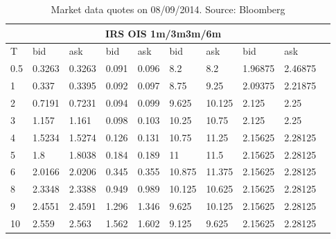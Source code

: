\documentclass[12pt,a4paper]{article}
\theoremstyle{plain}
\numberwithin{equation}{section}
\begin{document}
\begin{table}[t]
\begin{center}
\begin{tabular}{|l|l|l|l|l|l|l|l|l|l|}
\hline
\multicolumn{9}{|c|}{\;\;\;\;\;\;\;\;\;\;\;\;\;\;\;IRS \;\;\;\;\;\;\;\; \;\;\;\;\;\;\;\;\;\;\;\;OIS \;\;\;\;\;\;\;\;\;\;\;\;1m/3m\;\;\;\;\;\;\;\;\;\;\;\;\;3m/6m} \\\hline
T& bid& ask& bid& ask& bid& ask& bid& ask\\ \hline
0.5 & 0.3263 & 0.3263&0.091 & 0.096 & 8.2 & 8.2 & 1.96875 & 2.46875 \\
    1     & 0.337 & 0.3395 & 0.092 & 0.097 & 8.75  & 9.25  & 2.09375& 2.21875 \\
    2     & 0.7191 & 0.7231 & 0.094 & 0.099 & 9.625 & 10.125 & 2.125 & 2.25 \\
    3     & 1.157 & 1.161 & 0.098 & 0.103 & 10.25 & 10.75 & 2.125 & 2.25 \\
    4     & 1.5234 & 1.5274 & 0.126 & 0.131 & 10.75 & 11.25 & 2.15625 & 2.28125 \\
    5     & 1.8   & 1.8038 & 0.184 & 0.189 & 11    & 11.5  & 2.15625 & 2.28125 \\
    6     & 2.0166 & 2.0206 & 0.345 & 0.355 & 10.875 & 11.375 & 2.15625 & 2.28125 \\
    8     & 2.3348 & 2.3388 & 0.949 & 0.989 & 10.125 & 10.625 & 2.15625 & 2.28125 \\
    9     & 2.4551 & 2.4591 & 1.296 & 1.346 & 9.625 & 10.125 & 2.15625 & 2.28125 \\
    10    & 2.559 & 2.563 & 1.562 & 1.602 & 9.125 & 9.625 & 2.15625 & 2.28125 \\

\hline
\end{tabular}\\[1ex]
\caption{Market data quotes on 08/09/2014. Source: Bloomberg }\label{Marketdata:20140908}
\end{center}
\end{table}
\end{document}
